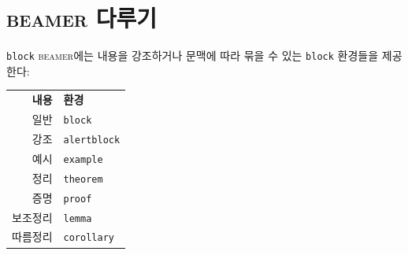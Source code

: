 \documentclass[compress]{beamer}
\begin{document}
\section{\textsc{beamer} 다루기}
\begin{frame}[fragile=singleslide,allowframebreaks]{\texttt{block}}
  \textsc{beamer}에는 내용을 강조하거나 문맥에 따라 묶을 수 있는 \texttt{block}
  환경들을 제공한다:
  \begin{center}
    \begin{tabular}{rl}
      \textbf{내용} & \textbf{환경}\\
      일반 & \verb/block/\\
      강조 & \verb/alertblock/\\
      예시 & \verb/example/\\
      정리 & \verb/theorem/\\
      증명 & \verb/proof/\\
      보조정리 & \verb/lemma/\\
      따름정리 & \verb/corollary/
    \end{tabular}
  \end{center}
  \framebreak


\end{frame}
\end{document}
